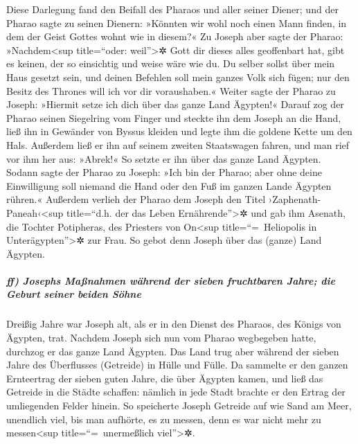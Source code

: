  Diese Darlegung fand den Beifall des Pharaos und aller
seiner Diener;  und der Pharao sagte zu seinen Dienern:
»Könnten wir wohl noch einen Mann finden, in dem der Geist Gottes wohnt
wie in diesem?«  Zu Joseph aber sagte der Pharao:
»Nachdem\textless sup title=``oder: weil''\textgreater✲ Gott dir dieses
alles geoffenbart hat, gibt es keinen, der so einsichtig und weise wäre
wie du.  Du selber sollst über mein Haus gesetzt sein,
und deinen Befehlen soll mein ganzes Volk sich fügen; nur den Besitz des
Thrones will ich vor dir voraushaben.«  Weiter sagte der
Pharao zu Joseph: »Hiermit setze ich dich über das ganze Land Ägypten!«
 Darauf zog der Pharao seinen Siegelring vom Finger und
steckte ihn dem Joseph an die Hand, ließ ihn in Gewänder von Byssus
kleiden und legte ihm die goldene Kette um den Hals. 
Außerdem ließ er ihn auf seinem zweiten Staatswagen fahren, und man rief
vor ihm her aus: »Abrek!« So setzte er ihn über das ganze Land Ägypten.
 Sodann sagte der Pharao zu Joseph: »Ich bin der Pharao;
aber ohne deine Einwilligung soll niemand die Hand oder den Fuß im
ganzen Lande Ägypten rühren.«  Außerdem verlieh der
Pharao dem Joseph den Titel ›Zaphenath-Paneah‹\textless sup title=``d.h.
der das Leben Ernährende''\textgreater✲ und gab ihm Asenath, die Tochter
Potipheras, des Priesters von On\textless sup title=``=~Heliopolis in
Unterägypten''\textgreater✲ zur Frau. So gebot denn Joseph über das
(ganze) Land Ägypten.

\hypertarget{ff-josephs-mauxdfnahmen-wuxe4hrend-der-sieben-fruchtbaren-jahre-die-geburt-seiner-beiden-suxf6hne}{%
\subparagraph{ff) Josephs Maßnahmen während der sieben fruchtbaren
Jahre; die Geburt seiner beiden
Söhne}\label{ff-josephs-mauxdfnahmen-wuxe4hrend-der-sieben-fruchtbaren-jahre-die-geburt-seiner-beiden-suxf6hne}}

 Dreißig Jahre war Joseph alt, als er in den Dienst des
Pharaos, des Königs von Ägypten, trat. Nachdem Joseph sich nun vom
Pharao wegbegeben hatte, durchzog er das ganze Land Ägypten.
 Das Land trug aber während der sieben Jahre des
Überflusses (Getreide) in Hülle und Fülle.  Da sammelte
er den ganzen Ernteertrag der sieben guten Jahre, die über Ägypten
kamen, und ließ das Getreide in die Städte schaffen: nämlich in jede
Stadt brachte er den Ertrag der umliegenden Felder hinein.
 So speicherte Joseph Getreide auf wie Sand am Meer,
unendlich viel, bis man aufhörte, es zu messen, denn es war nicht mehr
zu messen\textless sup title=``=~unermeßlich viel''\textgreater✲.

